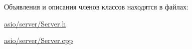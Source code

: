 Объявления и описания членов классов находятся в файлах\+:\begin{DoxyCompactItemize}
\item 
\mbox{\hyperlink{asio_2server_2_server_8h}{asio/server/\+Server.\+h}}\item 
\mbox{\hyperlink{asio_2server_2_server_8cpp}{asio/server/\+Server.\+cpp}}\end{DoxyCompactItemize}
